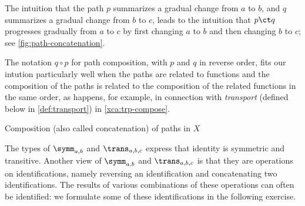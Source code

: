 The intuition that the path $p$ summarizes a gradual change from $a$ to $b$, and $q$ summarizes a gradual change from $b$ to $c$, leads to the
intuition that $p \ct q$ progresses gradually from $a$ to $c$ by first changing $a$ to $b$ and then changing $b$ to $c$; see
\cref{fig:path-concatenation}.

The notation $q\circ p$ for path composition, with $p$ and $q$ in reverse order,
fits our intution particularly well when the paths are related to functions and the composition of
the paths is related to the composition of the related functions in the same order, as happens, for example, in connection with {\em transport}
(defined below in \cref{def:transport}) in \cref{xca:trp-compose}.

\begin{marginfigure}
  \caption{Composition (also called concatenation) of paths in $X$}
  \label{fig:path-concatenation}
\end{marginfigure}

The types of $\symm_{a,b}$ and $\trans_{a,b,c}$ express that
identity is symmetric and transitive. Another view of
$\symm_{a,b}$ and $\trans_{a,b,c}$ is that they are
operations on identifications, namely reversing an identification
and concatenating two identifications.  The results of various combinations of these
operations can often be identified: we formulate some of these identifications in the following exercise.


